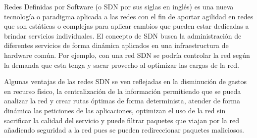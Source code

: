 \documentclass[10pt,journal,compsoc]{IEEEtran}
\begin{document}




% 
% 
% 
% 
 Redes Definidas por Software  (o SDN por sus siglas en inglés) es una nueva tecnología o paradigma aplicada a las redes con el fin  de aportar agilidad en redes que son estáticas o complejas para aplicar cambios que pueden estar dedicadas a brindar servicios individuales. El concepto de SDN busca la administración de diferentes servicios de forma dinámica aplicados en una infraestructura de hardware común. Por ejemplo, con una red SDN se podría controlar la red según la demanda que esta tenga y sacar provecho al optimizar las cargas de la red.

Algunas ventajas de las redes SDN se ven reflejadas en la disminución de gastos en recurso físico, la centralización de la información permitiendo que se pueda analizar la red y crear rutas óptimas de forma determinista, atender de forma dinámica las peticiones de las aplicaciones, optimizan el uso de la red sin sacrificar la calidad del servicio y puede filtrar paquetes que viajan por la red añadiendo seguridad a la red pues se pueden redireccionar paquetes maliciosos.
\end{document}
